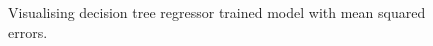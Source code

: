 \begin{figure}[H]
	\centering
	\caption{Visualising decision tree regressor trained model with mean squared errors.}
	\label{fig:o4}
\end{figure}
